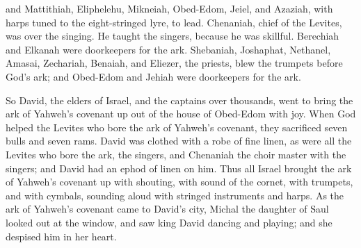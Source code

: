 {and Mattithiah, Eliphelehu, Mikneiah, Obed-Edom, Jeiel, and Azaziah, with harps tuned to the eight-stringed lyre, to lead.
Chenaniah, chief of the Levites, was over the singing. He taught the singers, because he was skillful.
Berechiah and Elkanah were doorkeepers for the ark.
Shebaniah, Joshaphat, Nethanel, Amasai, Zechariah, Benaiah, and Eliezer, the priests, blew the trumpets before God’s ark; and Obed-Edom and Jehiah were doorkeepers for the ark.
\par }{\PP {}So David, the elders of Israel, and the captains over thousands, went to bring the ark of Yahweh’s covenant up out of the house of Obed-Edom with joy.
When God helped the Levites who bore the ark of Yahweh’s covenant, they sacrificed seven bulls and seven rams.
David was clothed with a robe of fine linen, as were all the Levites who bore the ark, the singers, and Chenaniah the choir master with the singers; and David had an ephod of linen on him.
Thus all Israel brought the ark of Yahweh’s covenant up with shouting, with sound of the cornet, with trumpets, and with cymbals, sounding aloud with stringed instruments and harps.
As the ark of Yahweh’s covenant came to David’s city, Michal the daughter of Saul looked out at the window, and saw king David dancing and playing; and she despised him in her heart.

}
